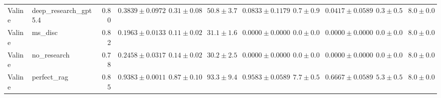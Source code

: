 \begin{table}[htbp]
\begin{tabular}{llrrrrrrrrr}
Valine & deep_research_gpt5.4 & 0.80 & $0.3839 \pm 0.0972$ & $0.31 \pm 0.08$ & $50.8 \pm 3.7$ & $0.0833 \pm 0.1179$ & $0.7 \pm 0.9$ & $0.0417 \pm 0.0589$ & $0.3 \pm 0.5$ & $8.0 \pm 0.0$ \\
Valine & ms_disc & 0.82 & \cellcolor{red!25}$0.1963 \pm 0.0133$ & $0.11 \pm 0.02$ & $31.1 \pm 1.6$ & $0.0000 \pm 0.0000$ & $0.0 \pm 0.0$ & $0.0000 \pm 0.0000$ & $0.0 \pm 0.0$ & $8.0 \pm 0.0$ \\
Valine & no_research & 0.78 & $0.2458 \pm 0.0317$ & $0.14 \pm 0.02$ & $30.2 \pm 2.5$ & $0.0000 \pm 0.0000$ & $0.0 \pm 0.0$ & $0.0000 \pm 0.0000$ & $0.0 \pm 0.0$ & $8.0 \pm 0.0$ \\
Valine & perfect_rag & 0.85 & \cellcolor{green!25}$0.9383 \pm 0.0011$ & $0.87 \pm 0.10$ & $93.3 \pm 9.4$ & $0.9583 \pm 0.0589$ & $7.7 \pm 0.5$ & $0.6667 \pm 0.0589$ & $5.3 \pm 0.5$ & $8.0 \pm 0.0$ \\
\bottomrule
\end{tabular}
\end{table}